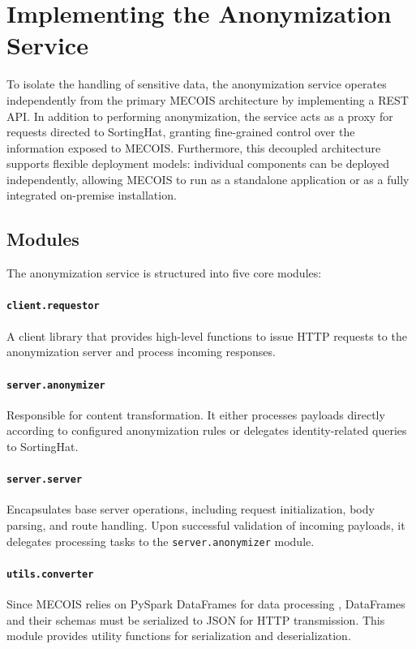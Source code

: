 \section{Implementing the Anonymization Service}
\label{sec:anonymization_server}

To isolate the handling of sensitive data, the anonymization service operates independently from the primary MECOIS architecture by implementing a \ac{REST} \ac{API}. In addition to performing anonymization, the service acts as a proxy for requests directed to SortingHat, granting fine-grained control over the information exposed to MECOIS. Furthermore, this decoupled architecture supports flexible deployment models: individual components can be deployed independently, allowing MECOIS to run as a standalone application or as a fully integrated on-premise installation.

\subsection{Modules}
The anonymization service is structured into five core modules:

\paragraph{\texttt{client.requestor}}
A client library that provides high-level functions to issue \ac{HTTP} requests to the anonymization server and process incoming responses.

\paragraph{\texttt{server.anonymizer}}
Responsible for content transformation. It either processes payloads directly according to configured anonymization rules or delegates identity-related queries to SortingHat.

\paragraph{\texttt{server.server}}
Encapsulates base server operations, including request initialization, body parsing, and route handling. Upon successful validation of incoming payloads, it delegates processing tasks to the \texttt{server.anonymizer} module.

\paragraph{\texttt{utils.converter}}
Since MECOIS relies on PySpark DataFrames for data processing \autocite{pyspark_dataframe_2026}, DataFrames and their schemas must be serialized to \ac{JSON} for \ac{HTTP} transmission. This module provides utility functions for serialization and deserialization.

